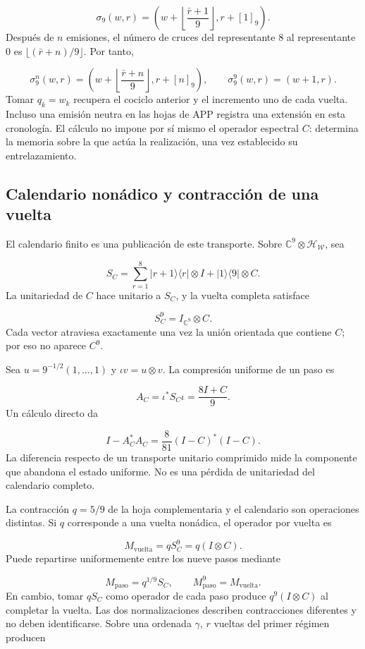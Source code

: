 \[
\sigma_9(w,r)=
\left(w+\left\lfloor\frac{\bar r+1}{9}\right\rfloor,r+[1]_9\right).
\]
Después de \(n\) emisiones, el número de cruces del representante \(8\) al representante \(0\) es \(\lfloor(\bar r+n)/9\rfloor\). Por tanto,

\[
\sigma_9^n(w,r)=
\left(w+\left\lfloor\frac{\bar r+n}{9}\right\rfloor,r+[n]_9\right),
\qquad
\sigma_9^9(w,r)=(w+1,r).
\]
Tomar \(q_k=w_k\) recupera el cociclo anterior y el incremento uno de cada vuelta. Incluso una emisión neutra en las hojas de APP registra una extensión en esta cronología. El cálculo no impone por sí mismo el operador espectral \(C\): determina la memoria sobre la que actúa la realización, una vez establecido su entrelazamiento.

\subsection{Calendario nonádico y contracción de una vuelta}
\label{viii:rz:calendario}
El calendario finito es una publicación de este transporte. Sobre \(\mathbb C^9\otimes\mathcal H_{\mathscr W}\), sea

\[
S_C=\sum_{r=1}^{8}|r+1\rangle\langle r|\otimes I
+|1\rangle\langle9|\otimes C.
\]
La unitariedad de \(C\) hace unitario a \(S_C\), y la vuelta completa satisface

\[
S_C^9=I_{\mathbb C^9}\otimes C.
\]
Cada vector atraviesa exactamente una vez la unión orientada que contiene \(C\); por eso no aparece \(C^9\).

Sea \(u=9^{-1/2}(1,\ldots,1)\) y \(\iota v=u\otimes v\). La compresión uniforme de un paso es

\[
A_C=\iota^*S_C\iota=\frac{8I+C}{9}.
\]
Un cálculo directo da

\[
I-A_C^*A_C
=\frac8{81}(I-C)^*(I-C).
\]
La diferencia respecto de un transporte unitario comprimido mide la componente que abandona el estado uniforme. No es una pérdida de unitariedad del calendario completo.

La contracción \(q=5/9\) de la hoja complementaria y el calendario son operaciones distintas. Si \(q\) corresponde a una vuelta nonádica, el operador por vuelta es

\[
M_{\mathrm{vuelta}}=qS_C^9
=q(I\otimes C).
\]
Puede repartirse uniformemente entre los nueve pasos mediante

\[
M_{\mathrm{paso}}=q^{1/9}S_C,\qquad
M_{\mathrm{paso}}^9=M_{\mathrm{vuelta}}.
\]
En cambio, tomar \(qS_C\) como operador de cada paso produce \(q^9(I\otimes C)\) al completar la vuelta. Las dos normalizaciones describen contracciones diferentes y no deben identificarse. Sobre una ordenada \(\gamma\), \(r\) vueltas del primer régimen producen

